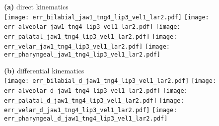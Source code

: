 \documentclass[varwidth=7.5in]{standalone}
\begin{document}
\raggedright

{\bf (a)} direct kinematics\\
\texttt{[image: err\_bilabial\_jaw1\_tng4\_lip3\_vel1\_lar2.pdf]}%
\texttt{[image: err\_alveolar\_jaw1\_tng4\_lip3\_vel1\_lar2.pdf]}%
\texttt{[image: err\_palatal\_jaw1\_tng4\_lip3\_vel1\_lar2.pdf]}%
\texttt{[image: err\_velar\_jaw1\_tng4\_lip3\_vel1\_lar2.pdf]}%
\texttt{[image: err\_pharyngeal\_jaw1\_tng4\_lip3\_vel1\_lar2.pdf]}

{\bf (b)} differential kinematics\\
\texttt{[image: err\_bilabial\_d\_jaw1\_tng4\_lip3\_vel1\_lar2.pdf]}%
\texttt{[image: err\_alveolar\_d\_jaw1\_tng4\_lip3\_vel1\_lar2.pdf]}%
\texttt{[image: err\_palatal\_d\_jaw1\_tng4\_lip3\_vel1\_lar2.pdf]}%
\texttt{[image: err\_velar\_d\_jaw1\_tng4\_lip3\_vel1\_lar2.pdf]}%
\texttt{[image: err\_pharyngeal\_d\_jaw1\_tng4\_lip3\_vel1\_lar2.pdf]}
\end{document}
